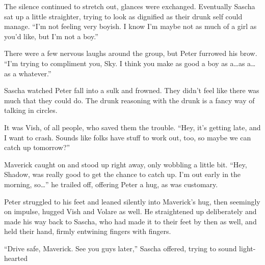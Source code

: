 The silence continued to stretch out, glances were exchanged.  Eventually Sascha sat up a little straighter, trying to look as dignified as their drunk self could manage. ``I'm not feeling very boyish. I know I'm maybe not as much of a girl as you'd like, but I'm not a boy.''

There were a few nervous laughs around the group, but Peter furrowed his brow. ``I'm trying to compliment you, Sky. I think you make as good a boy as a\ldots{}as a\ldots{}as a whatever.''

Sascha watched Peter fall into a sulk and frowned. They didn't feel like there was much that they could do. The drunk reasoning with the drunk is a fancy way of talking in circles.

It was Vish, of all people, who saved them the trouble. ``Hey, it's getting late, and I want to crash. Sounds like folks have stuff to work out, too, so maybe we can catch up tomorrow?''

Maverick caught on and stood up right away, only wobbling a little bit. ``Hey, Shadow, was really good to get the chance to catch up. I'm out early in the morning, so\ldots{}'' he trailed off, offering Peter a hug, as was customary.

Peter struggled to his feet and leaned silently into Maverick's hug, then seemingly on impulse, hugged Vish and Volare as well. He straightened up deliberately and made his way back to Sascha, who had made it to their feet by then as well, and held their hand, firmly entwining fingers with fingers.

``Drive safe, Maverick. See you guys later,'' Sascha offered, trying to sound light-hearted
